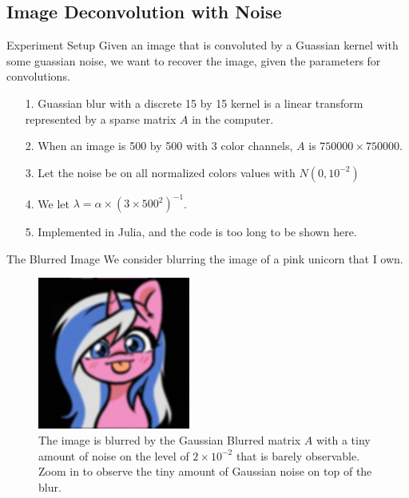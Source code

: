 \documentclass[11pt]{beamer}
\begin{document}
    \subsection{Image Deconvolution with Noise}
        \begin{frame}{Experiment Setup}
            Given an image that is convoluted by a Guassian kernel with some guassian noise, we want to recover the image, given the parameters for convolutions. 
            \begin{itemize}
                \item [1.] Guassian blur with a discrete 15 by 15 kernel is a linear transform represented by a sparse matrix $A$ in the computer. 
                \item [2.] When an image is 500 by 500 with 3 color channels, $A$ is $750000 \times 750000$. 
                \item [3.] Let the noise be on all normalized colors values with $N(0, 10^{-2})$
                \item [4.] We let $\lambda = \alpha\times (3\times500^2)^{-1}$. 
                \item [5.] Implemented in Julia, and the code is too long to be shown here. 
            \end{itemize}        
        \end{frame}
        \begin{frame}{The Blurred Image}
            We consider blurring the image of a pink unicorn that I own. 
            \begin{figure}[H]
                \centering
                \includegraphics[width=5cm]{blurred_img.jpg}
                \caption{The image is blurred by the Gaussian Blurred matrix $A$ with a tiny amount of noise on the level of $2\times 10^{-2}$ that is barely observable. Zoom in to observe the tiny amount of Gaussian noise on top of the blur.}
                \label{fig:blurred_alto}
            \end{figure}
        \end{frame}
\end{document}
